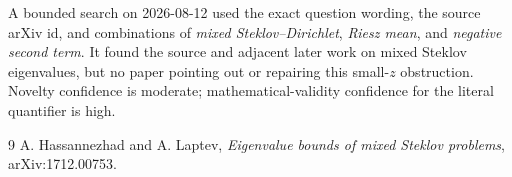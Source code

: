 \documentclass[11pt]{article}
\begin{document}
A bounded search on 2026-08-12 used the exact question wording, the source
arXiv id, and combinations of \emph{mixed Steklov--Dirichlet}, \emph{Riesz
mean}, and \emph{negative second term}. It found the source and adjacent later
work on mixed Steklov eigenvalues, but no paper pointing out or repairing this
small-$z$ obstruction. Novelty confidence is moderate; mathematical-validity
confidence for the literal quantifier is high.

\begin{thebibliography}{9}
A. Hassannezhad and A. Laptev,
\emph{Eigenvalue bounds of mixed Steklov problems},
arXiv:1712.00753.
\end{thebibliography}
\end{document}
